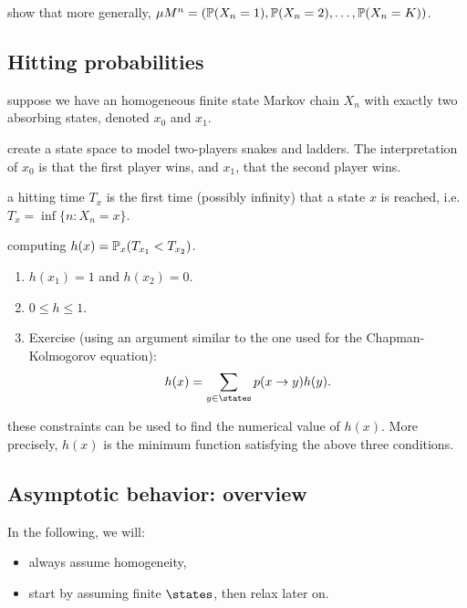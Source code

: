 \documentclass{article}
\begin{document}
 show that more generally, $\mu M^n = (\P(X_n = 1), \P(X_n = 2), \dots, \P(X_n = K))$.


\subsection{Hitting probabilities}

 suppose we have an homogeneous finite state Markov chain $X_n$ with exactly two absorbing states, denoted $x_0$ and $x_1$.

 create a state space to model two-players snakes and ladders. The interpretation of $x_0$ is that the first player wins, and $x_1$, that the second player wins. 

 a hitting time $T_x$ is the first time (possibly infinity) that a state $x$ is reached, i.e. $T_x = \inf \{n : X_n = x\}$. 

 computing $h(x) = \P_x(T_{x_1} < T_{x_2})$.

\begin{enumerate}
  \item $h(x_1) = 1$ and $h(x_2) = 0$.
  \item $0 \le h \le 1$.
  \item Exercise (using an argument similar to the one used for the Chapman-Kolmogorov equation): \[ h(x) = \sum_{y\in\states} p(x\to y) h(y). \]
\end{enumerate}

 these constraints can be used to find the numerical value of $h(x)$. More precisely, $h(x)$ is the minimum function satisfying the above three conditions.


\subsection{Asymptotic behavior: overview}

 In the following, we will:
\begin{itemize}
  \item always assume homogeneity,
  \item start by assuming finite $\states$, then relax later on.
\end{itemize}
\end{document}
